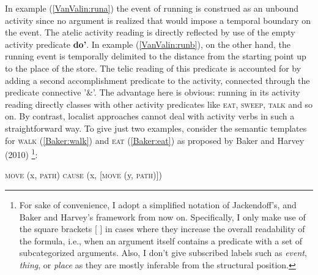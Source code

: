 In example (\ref{VanValin:runa}) the event of running is construed as an unbound activity since no argument is realized that would impose a temporal boundary on the event. The atelic activity reading is directly reflected by use of the empty activity predicate \textbf{do'}. In example (\ref{VanValin:runb}), on the other hand, the running event is temporally delimited to the distance from the starting point up to the place of the store. The telic reading of this predicate is accounted for by adding a second accomplishment predicate to the activity, connected through the predicate connective '\&'. The advantage here is obvious: running in its activity reading directly classes with other activity predicates like \textsc{eat}, \textsc{sweep}, \textsc{talk} and so on. By contrast, localist approaches cannot deal with activity verbs in such a straightforward way. To give just two examples, consider the semantic templates for \textsc{walk} (\ref{Baker:walk}) and \textsc{eat} (\ref{Baker:eat}) as proposed by Baker and Harvey (2010)
\footnote{For sake of convenience, I adopt a simplified notation of Jackendoff's, and Baker and Harvey's framework from now on. Specifically, I only make use of the square brackets [ ] in cases where they increase the overall readability of the formula, i.e., when an argument itself contains a predicate with a set of subcategorized arguments. Also, I don't give subscribed labels such as \textit{event}, \textit{thing}, or \textit{place} as they are mostly inferable from the structural position.}:

\ea \label{Baker}
\ea \textsc{move} (x, \textsc{path}) \label{Baker:walk}
\ex \textsc{cause} (x, [\textsc{move} (y, \textsc{path})]) \label{Baker:eat}
\z
\z

